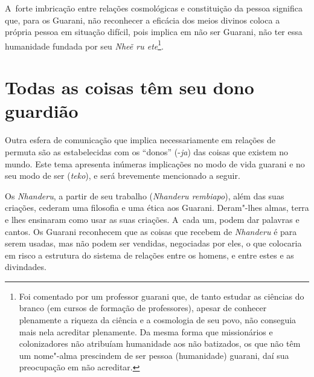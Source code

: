 A~forte imbricação entre relações cosmológicas e constituição da pessoa
significa que, para os Guarani, não reconhecer a eficácia dos meios
divinos coloca a própria pessoa em situação difícil, pois implica em
não ser Guarani, não ter essa humanidade fundada por seu \emph{Nheẽ ru
ete}\footnote{Foi comentado por um professor guarani que, de tanto
estudar as ciências do branco (em cursos de formação de professores),
apesar de conhecer plenamente a riqueza da ciência e a cosmologia de
seu povo, não conseguia mais nela acreditar plenamente. Da mesma forma
que missionários e colonizadores não atribuíam humanidade aos não
batizados, os que não têm um nome"-alma prescindem de ser pessoa
(humanidade) guarani, daí sua preocupação em não acreditar.}. 

\section{Todas as coisas têm seu dono guardião}

Outra esfera de comunicação que implica necessariamente em relações de
permuta são as estabelecidas com os ``donos'' (-\emph{ja}) das coisas que
existem no mundo. Este tema apresenta inúmeras implicações no modo de
vida guarani e no seu modo de ser (\emph{teko}), e será brevemente mencionado
a seguir. 

Os \emph{Nhanderu}, a partir de seu trabalho (\emph{Nhanderu rembiapo}), além das suas
criações, cederam uma filosofia e uma ética aos Guarani. Deram"-lhes
almas, terra e lhes ensinaram como usar as suas criações. A~cada um,
podem dar palavras e cantos. Os Guarani reconhecem que as coisas que
recebem de \emph{Nhanderu} é para serem usadas, mas não podem ser vendidas,
negociadas por eles, o que colocaria em risco a estrutura do sistema de
relações entre os homens, e entre estes e as divindades. 

